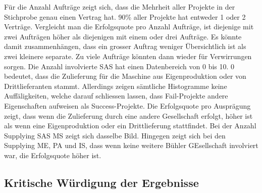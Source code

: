 Für die Anzahl Aufträge zeigt sich, dass die Mehrheit aller Projekte in der Stichprobe genau einen Vertrag hat. 90\% aller Projekte hat entweder 1 oder 2 Verträge. Vergleicht man die Erfolgsquote pro Anzahl Aufträge, ist diejenige mit zwei Aufträgen höher als diejenigen mit einem oder drei Aufträge. Es könnte damit zusammenhängen, dass ein grosser Auftrag weniger Übersichtlich ist als zwei kleinere separate. Zu viele Aufträge könnten dann wieder für Verwirrungen sorgen.\newline
Die Anzahl involvierte SAS hat einen Datenbereich von 0 bis 10. 0 bedeutet, dass die Zulieferung für die Maschine aus Eigenproduktion oder von Drittlieferanten stammt.  Allerdings zeigen sämtliche Histogramme keine Auffäligkeiten, welche darauf schliessen lassen, dass Fail-Projekte andere Eigenschaften aufweisen als Success-Projekte. Die Erfolgsquote pro Ausprägung zeigt, dass wenn die Zulieferung durch eine andere Gesellschaft erfolgt, höher ist als wenn eine Eigenproduktion oder ein Drittlieferung stattfindet. Bei der Anzahl Supplying SAS MS zeigt sich dasselbe Bild. Hingegen zeigt sich bei den Supplying ME, PA und IS, dass wenn keine weitere Bühler GEsellschaft involviert war, die Erfolgsquote höher ist.

\subsection{Kritische Würdigung der Ergebnisse}
\newpage	
	


